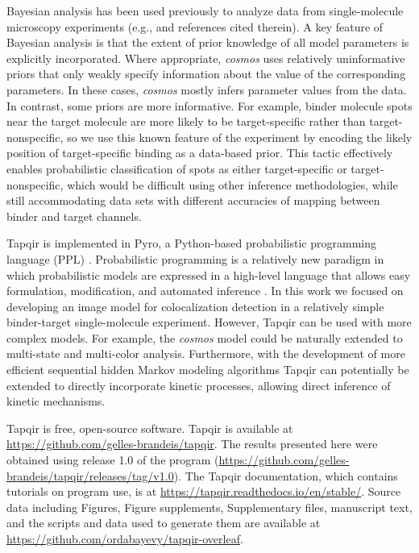 Bayesian analysis has been used previously to analyze data from single-molecule microscopy experiments (e.g., \cite{Kinz-Thompson2021-tb} and references cited therein). A key feature of Bayesian analysis is that the extent of prior knowledge of all model parameters is explicitly incorporated. Where appropriate, \emph{cosmos} uses relatively uninformative priors that only weakly specify information about the value of the corresponding parameters.  In these cases, \emph{cosmos} mostly infers parameter values from the data.  In contrast, some priors are more informative.  For example, binder molecule spots near the target molecule are more likely to be target-specific rather than target-nonspecific, so we use this known feature of the experiment by encoding the likely position of target-specific binding as a data-based prior. This tactic effectively enables probabilistic classification of spots as either target-specific or target-nonspecific, which would be difficult using other inference methodologies, while still accommodating data sets with different accuracies of mapping between binder and target channels.

Tapqir is implemented in Pyro, a Python-based probabilistic programming language (PPL) \citep{Bingham2019-qy}. Probabilistic programming is a relatively new paradigm in which probabilistic models are expressed in a high-level language that allows easy formulation, modification, and automated inference \citep{Van_de_Meent2018-mi}. In this work we focused on developing an image model for colocalization detection in a relatively simple binder-target single-molecule experiment. However, Tapqir can be used with more complex models. For example, the \emph{cosmos} model could be naturally extended to multi-state and multi-color analysis. Furthermore, with the development of more efficient sequential hidden Markov modeling algorithms \citep{Sarkka2019-jw,Obermeyer2019-pp} Tapqir can potentially be extended to directly incorporate kinetic processes, allowing direct inference of kinetic mechanisms.

Tapqir is free, open-source software. Tapqir is available at \url{https://github.com/gelles-brandeis/tapqir}. The results presented here were obtained using release 1.0 of the program (\url{https://github.com/gelles-brandeis/tapqir/releases/tag/v1.0}). The Tapqir documentation, which contains tutorials on program use, is at \url{https://tapqir.readthedocs.io/en/stable/}. Source data including Figures, Figure supplements, Supplementary files, manuscript text, and the scripts and data used to generate them are available at \url{https://github.com/ordabayevy/tapqir-overleaf}.